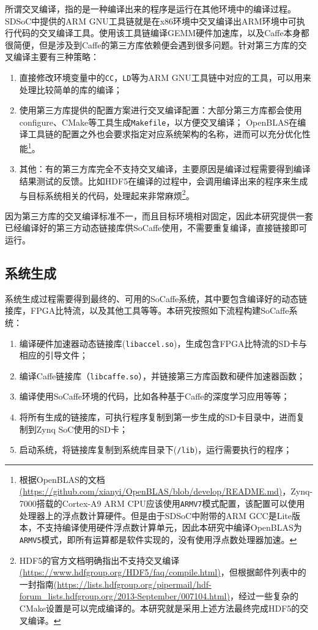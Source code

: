 所谓交叉编译，指的是一种编译出来的程序是运行在其他环境中的编译过程。SDSoC中提供的ARM GNU工具链就是在x86环境中交叉编译出ARM环境中可执行代码的交叉编译工具。使用该工具链编译GEMM硬件加速库，以及Caffe本身都很简便，但是涉及到Caffe的第三方库依赖便会遇到很多问题。针对第三方库的交叉编译主要有三种策略：

\begin{enumerate}
\item 直接修改环境变量中的\texttt{CC}，\texttt{LD}等为ARM GNU工具链中对应的工具，可以用来处理比较简单的库的编译；
\item 使用第三方库提供的配置方案进行交叉编译配置：大部分第三方库都会使用configure、CMake等工具生成\texttt{Makefile}，以方便交叉编译； OpenBLAS在编译工具链的配置之外也会要求指定对应系统架构的名称，进而可以充分优化性能\footnote{根据OpenBLAS的文档\url{(https://github.com/xianyi/OpenBLAS/blob/develop/README.md)}，Zynq-7000搭载的Cortex-A9 ARM CPU应该使用\texttt{ARMV7}模式配置，该配置可以使用处理器上的浮点数计算硬件。但是由于SDSoC中附带的ARM GCC是Lite版本，不支持编译使用硬件浮点数计算单元，因此本研究中编译OpenBLAS为\texttt{ARMV5}模式，即所有运算都是软件实现的，没有使用浮点数处理器加速。}。
\item 其他：有的第三方库完全不支持交叉编译，主要原因是编译过程需要得到编译结果测试的反馈。比如HDF5在编译的过程中，会调用编译出来的程序来生成与目标系统相关的代码，处理起来非常麻烦\footnote{HDF5的官方文档明确指出不支持交叉编译\url{(https://www.hdfgroup.org/HDF5/faq/compile.html)}，但根据邮件列表中的一封指南\url{(https://lists.hdfgroup.org/pipermail/hdf-forum_lists.hdfgroup.org/2013-September/007104.html)}，经过一些复杂的CMake设置是可以完成编译的。本研究就是采用上述方法最终完成HDF5的交叉编译。}。
\end{enumerate}

因为第三方库的交叉编译标准不一，而且目标环境相对固定，因此本研究提供一套已经编译好的第三方动态链接库供SoCaffe使用，不需要重复编译，直接链接即可运行。

\subsection{系统生成}

系统生成过程需要得到最终的、可用的SoCaffe系统，其中要包含编译好的动态链接库，FPGA比特流，以及其他工具等等。本研究按照如下流程构建SoCaffe系统：

\begin{enumerate}
\item 编译硬件加速器动态链接库(\texttt{libaccel.so})，生成包含FPGA比特流的SD卡与相应的引导文件；
\item 编译Caffe链接库（\texttt{libcaffe.so}），并链接第三方库函数和硬件加速器函数；
\item 编译使用SoCaffe环境的代码，比如各种基于Caffe的深度学习应用等等；
\item 将所有生成的链接库，可执行程序复制到第一步生成的SD卡目录中，进而复制到Zynq SoC使用的SD卡；
\item 启动系统，将链接库复制到系统库目录下(\texttt{/lib})，运行需要执行的程序；
\end{enumerate}

